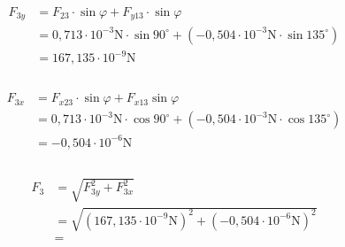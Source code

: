 \begin{enumerate}
        \begin{align*}
          F_{3y} & = F_{23}\cdot\sin{\varphi}+F_{y13}\cdot\sin{\varphi}                                               \\
                 & =  0,713\cdot 10^{-3}\text{N}\cdot\sin{90^\circ}+(-0,504\cdot 10^{-3}\text{N}\cdot\sin{135^\circ}) \\
                 & = 167,135\cdot 10^{-9}\text{N}                                                                     \\                                                                                                                                                                 \\
        \end{align*}

        \begin{align*}
          F_{3x} & = F_{x23}\cdot\sin{\varphi}+F_{x13}\sin{\varphi}                                                   \\
                 & =  0,713\cdot 10^{-3}\text{N}\cdot\cos{90^\circ}+(-0,504\cdot 10^{-3}\text{N}\cdot\cos{135^\circ}) \\
                 & = -0,504\cdot 10^{-6}\text{N}                                                                      \\                                                                                                                                                                 \\
        \end{align*}

        \begin{align*}
          F_{3} & =\sqrt{F_{3y}^2+F_{3x}^2}                                                  \\
                & =  \sqrt{(167,135\cdot 10^{-9}\text{N})^2+(-0,504\cdot 10^{-6}\text{N})^2} \\
                & =                                                                          \\
        \end{align*}

\end{enumerate}
